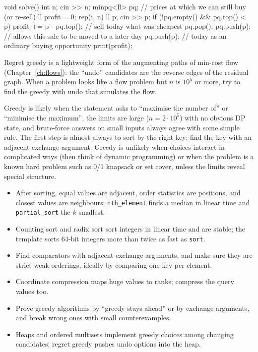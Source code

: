 \begin{code}
void solve() {
    int n;
    cin >> n;
    minpq<ll> pq;  // prices at which we can still buy (or re-sell)
    ll profit = 0;
    rep(i, n) {
        ll p;
        cin >> p;
        if (!pq.empty() && pq.top() < p) {
            profit += p - pq.top();  // sell today what was cheapest
            pq.pop();
            pq.push(p);  // allows this sale to be moved to a later day
        }
        pq.push(p);  // today as an ordinary buying opportunity
    }
    print(profit);
}
\end{code}

Regret greedy is a lightweight form of the augmenting paths of min-cost flow (Chapter~\ref{ch:flows}): the ``undo'' candidates
are the reverse edges of the residual graph. When a problem looks like a flow problem but $n$ is $10^5$ or more, try to find
the greedy with undo that simulates the flow.

\begin{recognize}
Greedy is likely when the statement asks to ``maximise the number of'' or ``minimise the maximum'', the limits are large
($n = 2\cdot10^5$) with no obvious DP state, and brute-force answers on small inputs always agree with some simple rule. The
first step is almost always to sort by the right key; find the key with an adjacent exchange argument. Greedy is unlikely
when choices interact in complicated ways (then think of dynamic programming) or when the problem is a known hard problem
such as 0/1 knapsack or set cover, unless the limits reveal special structure.
\end{recognize}

\begin{summary}
\begin{itemize}
  \item After sorting, equal values are adjacent, order statistics are positions, and closest values are neighbours;
        \texttt{nth\_element} finds a median in linear time and \texttt{partial\_sort} the $k$ smallest.
  \item Counting sort and radix sort sort integers in linear time and are stable; the template sorts 64-bit integers more
        than twice as fast as \texttt{sort}.
  \item Find comparators with adjacent exchange arguments, and make sure they are strict weak orderings, ideally by
        comparing one key per element.
  \item Coordinate compression maps huge values to ranks; compress the query values too.
  \item Prove greedy algorithms by ``greedy stays ahead'' or by exchange arguments, and break wrong ones with small
        counterexamples.
  \item Heaps and ordered multisets implement greedy choices among changing candidates; regret greedy pushes undo options
        into the heap.
\end{itemize}
\end{summary}

